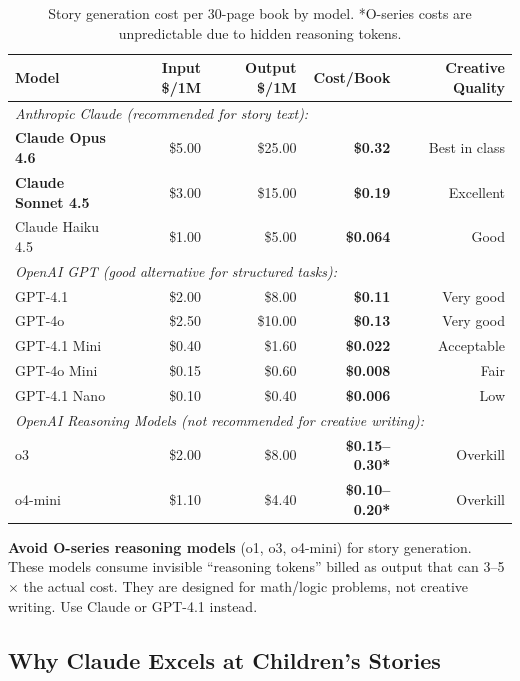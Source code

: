 \documentclass[12pt, letterpaper, oneside]{book}
\newcommand{\cost}[1]{\textcolor{money}{\textbf{#1}}}
\begin{document}
\begin{table}[H]
\centering
\small
\begin{tabularx}{\textwidth}{Xrrrr}
\toprule
\textbf{Model} & \textbf{Input \$/1M} & \textbf{Output \$/1M} & \textbf{Cost/Book} & \textbf{Creative Quality} \\
\midrule
\multicolumn{5}{l}{\textit{Anthropic Claude (recommended for story text):}} \\
\textbf{Claude Opus 4.6} & \$5.00 & \$25.00 & \cost{\$0.32} & Best in class \\
\textbf{Claude Sonnet 4.5} & \$3.00 & \$15.00 & \cost{\$0.19} & Excellent \\
Claude Haiku 4.5 & \$1.00 & \$5.00 & \cost{\$0.064} & Good \\
\midrule
\multicolumn{5}{l}{\textit{OpenAI GPT (good alternative for structured tasks):}} \\
GPT-4.1 & \$2.00 & \$8.00 & \cost{\$0.11} & Very good \\
GPT-4o & \$2.50 & \$10.00 & \cost{\$0.13} & Very good \\
GPT-4.1 Mini & \$0.40 & \$1.60 & \cost{\$0.022} & Acceptable \\
GPT-4o Mini & \$0.15 & \$0.60 & \cost{\$0.008} & Fair \\
GPT-4.1 Nano & \$0.10 & \$0.40 & \cost{\$0.006} & Low \\
\midrule
\multicolumn{5}{l}{\textit{OpenAI Reasoning Models (not recommended for creative writing):}} \\
o3 & \$2.00 & \$8.00 & \cost{\$0.15--0.30*} & Overkill \\
o4-mini & \$1.10 & \$4.40 & \cost{\$0.10--0.20*} & Overkill \\
\bottomrule
\end{tabularx}
\caption{Story generation cost per 30-page book by model. *O-series costs are unpredictable due to hidden reasoning tokens.}
\end{table}

\begin{warningbox}
\textbf{Avoid O-series reasoning models} (o1, o3, o4-mini) for story generation. These models consume invisible ``reasoning tokens'' billed as output that can 3--5$\times$ the actual cost. They are designed for math/logic problems, not creative writing. Use Claude or GPT-4.1 instead.
\end{warningbox}

\subsection{Why Claude Excels at Children's Stories}
\end{document}
